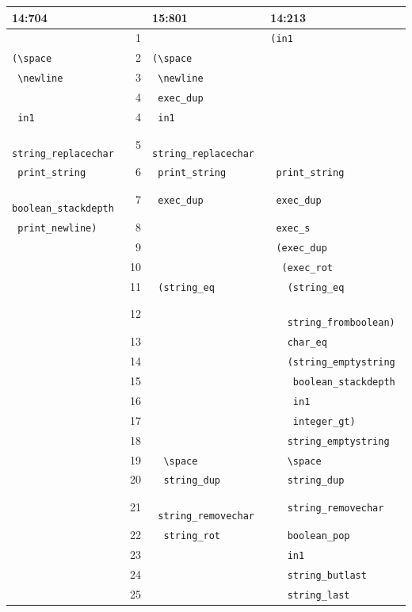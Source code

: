 \begin{table}
\begin{tabular}{l|rl|l}
	\textbf{14:704} & & \textbf{15:801} & \textbf{14:213} \\
	\hline
& 1 & & \texttt{(in1} \\ 
\texttt{(\textbackslash space} & 2 & \texttt{(\textbackslash space} & \\ 
\texttt{ \textbackslash newline} & 3 & \texttt{ \textbackslash newline} &  \\ 
& 4 & \texttt{ exec\_dup} &  \\ 
\texttt{ in1} & 4 & \texttt{ in1} &  \\ 
\texttt{ string\_replacechar} & 5 & \texttt{ string\_replacechar} &  \\ 
\texttt{ print\_string} & 6 & \texttt{ print\_string} & \texttt{ print\_string} \\ 
\texttt{ boolean\_stackdepth} & 7 & \texttt{ exec\_dup} & \texttt{ exec\_dup} \\ 
\texttt{ print\_newline)} & 8 &  & \texttt{ exec\_s} \\ 
& 9 &  & \texttt{ (exec\_dup} \\ 
& 10 &  & \texttt{ \ (exec\_rot} \\ 
& 11 & \texttt{ (string\_eq} & \texttt{ \ \ (string\_eq} \\
& 12 & &  \texttt{ \ \ \ string\_fromboolean)} \\ 
& 13 &  & \texttt{ \ \ char\_eq} \\ 
& 14 & & \texttt{ \ \ (string\_emptystring} \\
& 15 & &  \texttt{ \ \ \ boolean\_stackdepth} \\
& 16 & & \texttt{ \ \ \ in1} \\
& 17 & & \texttt{ \ \ \ integer\_gt)} \\ 
& 18 &  & \texttt{ \ \ string\_emptystring} \\ 
& 19 & \texttt{ \ \textbackslash space} & \texttt{ \ \ \textbackslash space} \\ 
& 20 & \texttt{ \ string\_dup} & \texttt{ \ \ string\_dup} \\ 
& 21 & \texttt{ \ string\_removechar} & \texttt{ \ \ string\_removechar} \\ 
& 22 & \texttt{ \ string\_rot} & \texttt{ \ \ boolean\_pop} \\ 
& 23 &   & \texttt{ \ \ in1} \\ 
& 24 &   & \texttt{ \ \ string\_butlast} \\ 
& 25 &   & \texttt{ \ \ string\_last} \\ 

\end{tabular}
\end{table}
